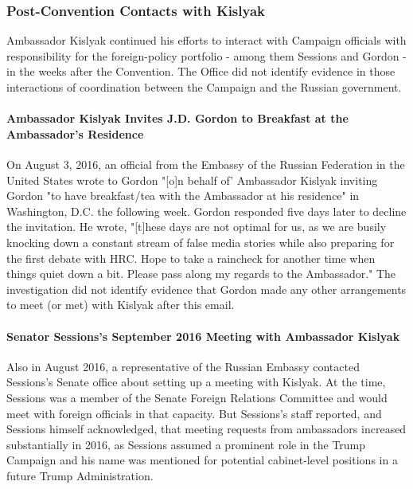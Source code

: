 \subsubsection{Post-Convention Contacts with Kislyak}

Ambassador Kislyak continued his efforts to interact with Campaign officials with responsibility for the foreign-policy portfolio - among them Sessions and Gordon - in the weeks after the Convention.
The Office did not identify evidence in those interactions of coordination between the Campaign and the Russian government.

\paragraph{Ambassador Kislyak Invites J.D. Gordon to Breakfast at the Ambassador's Residence}

On August 3, 2016, an official from the Embassy of the Russian Federation in the United States wrote to Gordon "[o]n behalf of' Ambassador Kislyak inviting Gordon "to have breakfast/tea with the Ambassador at his residence" in Washington, D.C. the following week.%
Gordon responded five days later to decline the invitation.
He wrote, "[t]hese days are not optimal for us, as we are busily knocking down a constant stream of false media stories while also preparing for the first debate with HRC.
Hope to take a raincheck for another time when things quiet down a bit.
Please pass along my regards to the Ambassador."%
The investigation did not identify evidence that Gordon made any other arrangements to meet (or met) with Kislyak after this email.

\paragraph{Senator Sessions's September 2016 Meeting with Ambassador Kislyak}

Also in August 2016, a representative of the Russian Embassy contacted Sessions's Senate office about setting up a meeting with Kislyak.%
At the time, Sessions was a member of the Senate Foreign Relations Committee and would meet with foreign officials in that capacity.%
But Sessions's staff reported, and Sessions himself acknowledged, that meeting requests from ambassadors increased substantially in 2016, as Sessions assumed a prominent role in the Trump Campaign and his name was mentioned for potential cabinet-level positions in a future Trump Administration.%

